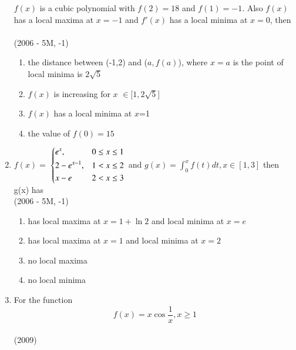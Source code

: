 \documentclass[journal,12pt,twocolumn]{IEEEtran}
\theoremstyle{remark}
\begin{document}
\begin{enumerate}
{            $f(x)$ is a cubic polynomial with  $f(2)=18$ and $f(1)=-1$. Also $f(x)$ has a local maxima at $x=-1$ and $f'(x)$ has a local minima at $x=0$, then
            \\ \text{   } \\ \text{   } \hfill
                {(2006 - 5M, -1)}
            
            \begin{enumerate}
                \item the distance between (-1,2) and ($a,f(a)$), where $x=a$ is the point of local minima is $2\sqrt{5}$
                \item $f(x)$ is increasing for $x$ $\in [1,2\sqrt{5}$]
                \item $f(x)$ has a local minima at $x$=1
                \item the value of $f(0)=15$
            \end{enumerate}
        
        }
    \item{
        
            $f(x) = $    
            $\begin{dcases}%
                e^x, & 0 \leq x\leq 1 \\
                2-e^{x-1}, & 1 < x\leq 2 \\
                x-e & 2 < x\leq 3 \\
            \end{dcases}$ and $g(x) = \int_0^{x}f(t)dt, x \in[1,3]$ then g(x) has
            \\ \text{   } \hfill
                {(2006 - 5M, -1)}
            
            \begin{enumerate}
                \item has local maxima at $x = 1+ \ln{2}$ and local minima at $x = e$
                \item has local maxima at $x = 1$ and local minima at $x = 2$
                \item no local maxima
                \item no local minima
            \end{enumerate}
        
        }
    \item{
        
            For the function $$f(x) = x\cos{\frac{1}{x}}, x\geq1$$
            \\ \text{   } \hfill
                {(2009)}
            
}
\end{enumerate}
\end{document}
